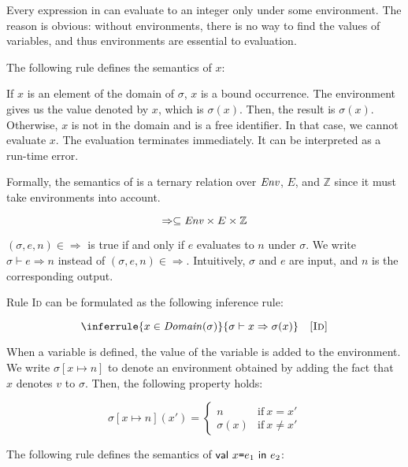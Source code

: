 Every expression in \lang can evaluate to an integer only under some
environment. The reason is obvious: without environments, there is no way to
find the values of variables, and thus environments are essential to evaluation.

The following rule defines the semantics of $x$:


If $x$ is an element of the domain of $\sigma$, $x$ is a bound occurrence. The
environment gives us the value denoted by $x$, which is $\sigma(x)$. Then, the
result is $\sigma(x)$. Otherwise, $x$ is not in the domain and is a free
identifier. In that case, we cannot evaluate $x$. The evaluation terminates
immediately. It can be interpreted as a run-time error.

Formally, the semantics of \lang is a
ternary relation over $\mbox{\emph{Env}}$, $E$, and $\mathbb{Z}$ since it must take
environments into account.

\[\Rightarrow\subseteq\mbox{\emph{Env}}\times E\times\mathbb{Z}\]

$(\sigma,e,n)\in\Rightarrow$ is true if and only if
$e$ evaluates to $n$ under $\sigma$.
We write $\sigma\vdash e\Rightarrow n$ instead of $(\sigma,e,n)\in\Rightarrow$.
Intuitively, $\sigma$ and $e$ are input, and $n$ is the corresponding output.

Rule \textsc{Id} can be formulated as the following inference rule:

\[
  \inferrule
  { x\in\dom{\sigma} }
  { \evald{x}{\sigma(x)} }
  \quad\textsc{[Id]}
\]

When a variable is defined, the value of the variable is added to the environment.
We write $\sigma[x\mapsto n]$ to denote an environment obtained by adding the
fact that $x$ denotes $v$ to $\sigma$. Then, the following property holds:

\[
\sigma [x\mapsto n](x') =
\begin{cases}
  n & \text{if}\ x=x' \\
  \sigma(x) & \text{if}\ x\neq x'
\end{cases}
\]

The following rule defines the semantics of $\textsf{val}\ x\texttt{=} e_1\ \textsf{in}\ e_2$:



